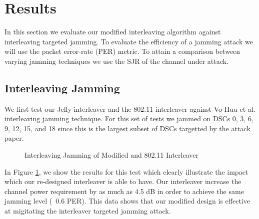 \documentclass[sigconf]{acmart}
\begin{document}
\section{Results}
\label{sec:results}

In this section we evaluate our modified interleaving algorithm against interleaving targeted jamming. To evaluate the efficiency of a jamming attack we will use the packet error-rate (PER) metric. To attain a comparison between varying jamming techniques we use the SJR of the channel under attack.  

\subsection{Interleaving Jamming}

We first test our Jelly interleaver and the 802.11 interleaver against Vo-Huu et al. interleaving jamming technique. For this set of tests we jammed on DSCs 0, 3, 6, 9, 12, 15, and 18 since this is the largest subset of DSCs targetted by the attack paper. 

\begin{figure}[h]
    \centering
    
    
    \caption{Interleaving Jamming of Modified and 802.11 Interleaver}
    \label{fig:interleaving_jamming}
\end{figure}

In Figure \ref{fig:interleaving_jamming}, we show the results for this test which clearly illustrate the impact which our re-designed interleaver is able to have. Our interleaver increase the channel power requirement by as much as 4.5 dB in order to achieve the same jamming level (~0.6 PER). This data shows that our modified design is effective at migitating the interleaver targeted jamming attack. 
\end{document}
